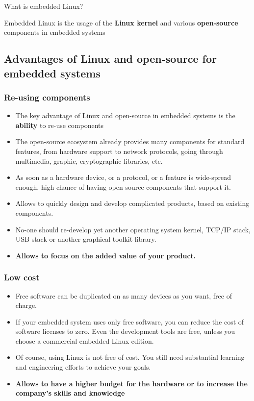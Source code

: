 \begin{frame}{What is embedded Linux?}
  \huge
  \begin{center}
    Embedded Linux is the usage of the {\bf Linux kernel} and various
    {\bf open-source} components in embedded systems
  \end{center}
\end{frame}

\subsection[Why embedded Linux?]{Advantages of Linux and open-source
  for embedded systems}

\begin{frame}
  \frametitle{Re-using components}
  \begin{itemize}
  \item The key advantage of Linux and open-source in embedded systems
    is the {\bf ability} to re-use components
  \item The open-source ecosystem already provides many components for
    standard features, from hardware support to network protocols,
    going through multimedia, graphic, cryptographic libraries, etc.
  \item As soon as a hardware device, or a protocol, or a feature is
    wide-spread enough, high chance of having open-source components
    that support it.
  \item Allows to quickly design and develop complicated products,
    based on existing components.
  \item No-one should re-develop yet another operating system kernel,
    TCP/IP stack, USB stack or another graphical toolkit library.
  \item {\bf Allows to focus on the added value of your product.}
  \end{itemize}
\end{frame}

\begin{frame}
  \frametitle{Low cost}
  \begin{itemize}
  \item Free software can be duplicated on as many devices as you
    want, free of charge.
  \item If your embedded system uses only free software, you can
    reduce the cost of software licenses to zero. Even the development
    tools are free, unless you choose a commercial embedded Linux
    edition.
  \item Of course, using Linux is not free of cost. You still need
    substantial learning and engineering efforts to achieve your
    goals.
  \item {\bf Allows to have a higher budget for the hardware or to
      increase the company’s skills and knowledge}
  \end{itemize}
\end{frame}

